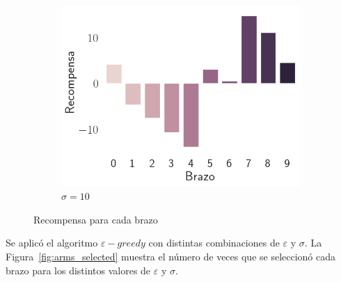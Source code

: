 \documentclass[12pt]{article}
\begin{document}
\begin{figure}[H]
\begin{subfigure}[H]{0.3\textwidth}
            \includegraphics[width=\textwidth]{../img/rewards_sigma_10}
            \caption{$\sigma=10$}
            \label{fig:rewards_10}
        \end{subfigure}
        \caption[Recompensa para cada brazo]{Recompensa para cada brazo\footnotemark}
        \label{fig:rewards}
    \end{figure}


    Se aplicó el algoritmo $\varepsilon-greedy$ con distintas combinaciones de $\varepsilon$ y $\sigma$.
    La Figura~\ref{fig:arms_selected} muestra el número de veces que se seleccionó cada brazo para los distintos valores de $\varepsilon$ y $\sigma$.
\end{document}

